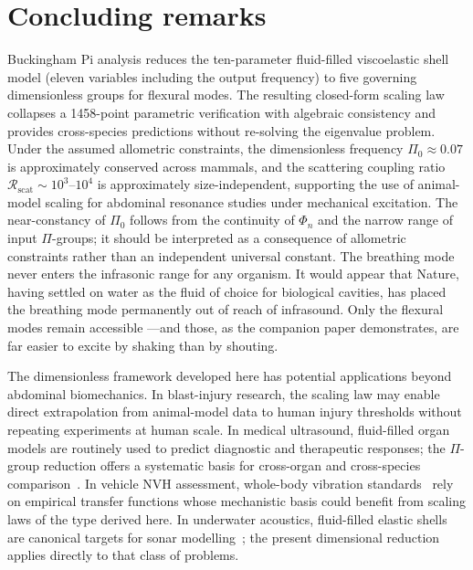 \documentclass[review]{elsarticle}
\begin{document}
\section{Concluding remarks}
\label{sec:conclusion}

Buckingham Pi analysis reduces the ten-parameter fluid-filled
viscoelastic shell model (eleven variables including the output frequency) to five governing dimensionless groups for
flexural modes.  The resulting closed-form scaling law collapses a
1458-point parametric verification with algebraic consistency and provides
cross-species predictions without re-solving the eigenvalue problem.
Under the assumed allometric constraints, the dimensionless frequency
$\Pi_0 \approx 0.07$ is approximately conserved across mammals, and the
scattering coupling ratio
$\mathcal{R}_\mathrm{scat} \sim 10^3$--$10^4$ is approximately size-independent,
supporting the use of animal-model scaling for abdominal resonance
studies under mechanical excitation.  The near-constancy of $\Pi_0$
follows from the continuity of $\Phi_n$ and the narrow range of input
$\Pi$-groups; it should be interpreted as a consequence of allometric
constraints rather than an independent universal constant.  The breathing
mode never enters the infrasonic range for any organism.
It would appear that Nature, having settled on water as the fluid of
choice for biological cavities, has placed the breathing mode permanently
out of reach of infrasound.  Only the flexural modes remain accessible
---and those, as the companion paper demonstrates, are far easier to
excite by shaking than by shouting.

The dimensionless framework developed here has potential applications beyond
abdominal biomechanics.  In blast-injury research, the scaling law
may enable direct extrapolation from animal-model data to human injury
thresholds without repeating experiments at human scale.  In medical
ultrasound, fluid-filled organ models are routinely used to predict
diagnostic and therapeutic responses; the $\Pi$-group reduction offers
a systematic basis for cross-organ and cross-species
comparison~\cite{Abramson1966,FahyGardonio2007}.  In vehicle NVH
assessment, whole-body vibration standards~\cite{ISO2631} rely on
empirical transfer functions whose mechanistic basis could benefit from
scaling laws of the type derived here.  In underwater
acoustics, fluid-filled elastic shells are canonical targets for sonar
modelling~\cite{Junger1952,Junger1986}; the present dimensional
reduction applies directly to that class of problems.
\end{document}

